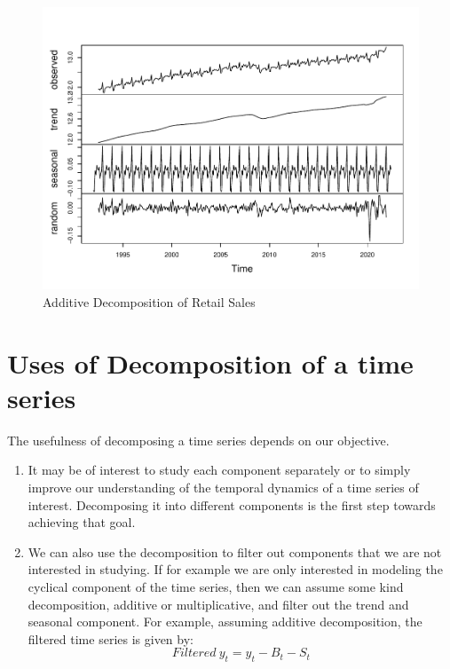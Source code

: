 \documentclass[]{book}
\theoremstyle{definition}
\theoremstyle{definition}
\theoremstyle{definition}
\theoremstyle{remark}
\begin{document}
\begin{figure}

{\centering \includegraphics[width=0.8\linewidth]{bookdown-demo_files/figure-latex/ch3-figure1-1} 

}

\caption{Additive Decomposition of Retail Sales}\label{fig:ch3-figure1}
\end{figure}

\hypertarget{uses-of-decomposition-of-a-time-series}{%
\section{Uses of Decomposition of a time series}\label{uses-of-decomposition-of-a-time-series}}

The usefulness of decomposing a time series depends on our objective.

\begin{enumerate}
\def\labelenumi{\arabic{enumi}.}
\item
  It may be of interest to study each component separately or to simply improve our understanding of the temporal dynamics of a time series of interest. Decomposing it into different components is the first step towards achieving that goal.
\item
  We can also use the decomposition to filter out components that we are not interested in studying. If for example we are only interested in modeling the cyclical component of the time series, then we can assume some kind decomposition, additive or multiplicative, and filter out the trend and seasonal component. For example, assuming additive decomposition, the filtered time series is given by:
  \begin{equation}
  Filtered \ y_t= y_t-B_t-S_t
  \end{equation}
\end{enumerate}
\end{document}
